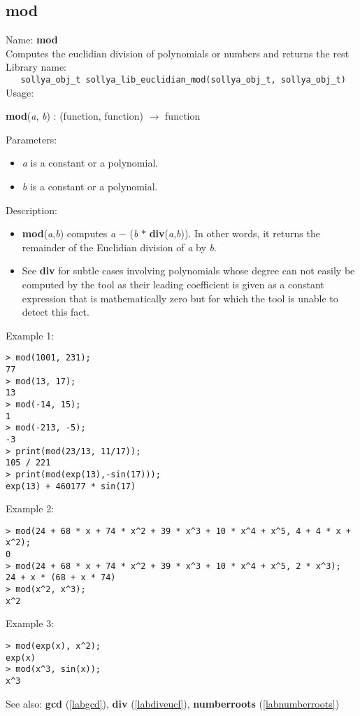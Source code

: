 \subsection{mod}
\label{labmodeucl}
\noindent Name: \textbf{mod}\\
\phantom{aaa}Computes the euclidian division of polynomials or numbers and returns the rest\\[0.2cm]
\noindent Library name:\\
\verb|   sollya_obj_t sollya_lib_euclidian_mod(sollya_obj_t, sollya_obj_t)|\\[0.2cm]
\noindent Usage: 
\begin{center}
\textbf{mod}(\emph{a}, \emph{b}) : (\textsf{function}, \textsf{function}) $\rightarrow$ \textsf{function}\\
\end{center}
Parameters: 
\begin{itemize}
\item \emph{a} is a constant or a polynomial.
\item \emph{b} is a constant or a polynomial.
\end{itemize}
\noindent Description: \begin{itemize}

\item \textbf{mod}(\emph{a},\emph{b}) computes \emph{a} \textbf{$-$} (\emph{b} \textbf{$*$} \textbf{div}(\emph{a},\emph{b})).
   In other words, it returns the remainder of the Euclidian division
   of \emph{a} by \emph{b}.

\item See \textbf{div} for subtle cases involving polynomials whose degree can
   not easily be computed by the tool as their leading coefficient is
   given as a constant expression that is mathematically zero but for
   which the tool is unable to detect this fact.
\end{itemize}
\noindent Example 1: 
\begin{center}\begin{minipage}{15cm}\begin{Verbatim}[frame=single]
> mod(1001, 231);
77
> mod(13, 17);
13
> mod(-14, 15);
1
> mod(-213, -5);
-3
> print(mod(23/13, 11/17));
105 / 221
> print(mod(exp(13),-sin(17)));
exp(13) + 460177 * sin(17)
\end{Verbatim}
\end{minipage}\end{center}
\noindent Example 2: 
\begin{center}\begin{minipage}{15cm}\begin{Verbatim}[frame=single]
> mod(24 + 68 * x + 74 * x^2 + 39 * x^3 + 10 * x^4 + x^5, 4 + 4 * x + x^2);
0
> mod(24 + 68 * x + 74 * x^2 + 39 * x^3 + 10 * x^4 + x^5, 2 * x^3);
24 + x * (68 + x * 74)
> mod(x^2, x^3);
x^2
\end{Verbatim}
\end{minipage}\end{center}
\noindent Example 3: 
\begin{center}\begin{minipage}{15cm}\begin{Verbatim}[frame=single]
> mod(exp(x), x^2);
exp(x)
> mod(x^3, sin(x));
x^3
\end{Verbatim}
\end{minipage}\end{center}
See also: \textbf{gcd} (\ref{labgcd}), \textbf{div} (\ref{labdiveucl}), \textbf{numberroots} (\ref{labnumberroots})
